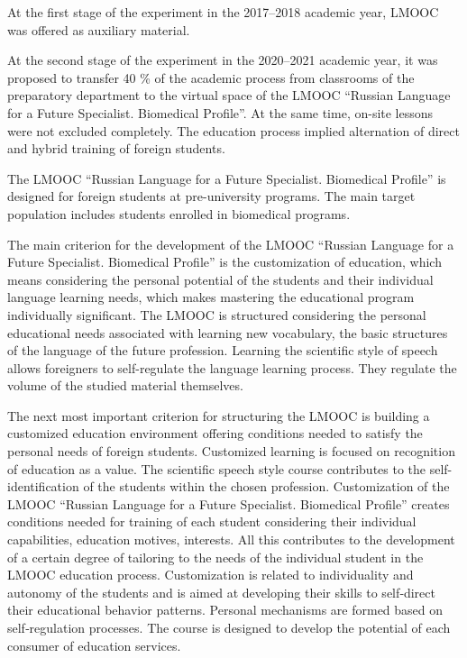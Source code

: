 \documentclass[english]{textolivre}
\begin{document}
At the first stage of the experiment in the 2017–2018 academic year, LMOOC was offered as auxiliary material.

At the second stage of the experiment in the 2020–2021 academic year, it was proposed to transfer 40 \% of the academic process from classrooms of the preparatory department to the virtual space of the LMOOC “Russian Language for a Future Specialist. Biomedical Profile”. At the same time, on-site lessons were not excluded completely. The education process implied alternation of direct and hybrid training of foreign students.

The LMOOC “Russian Language for a Future Specialist. Biomedical Profile” is designed for foreign students at pre-university programs. The main target population includes students enrolled in biomedical programs.

The main criterion for the development of the LMOOC “Russian Language for a Future Specialist. Biomedical Profile” is the customization of education, which means considering the personal potential of the students and their individual language learning needs, which makes mastering the educational program individually significant. The LMOOC is structured considering the personal educational needs associated with learning new vocabulary, the basic structures of the language of the future profession. Learning the scientific style of speech allows foreigners to self-regulate the language learning process. They regulate the volume of the studied material themselves.

The next most important criterion for structuring the LMOOC is building a customized education environment offering conditions needed to satisfy the personal needs of foreign students. Customized learning is focused on recognition of education as a value. The scientific speech style course contributes to the self-identification of the students within the chosen profession. Customization of the LMOOC “Russian Language for a Future Specialist. Biomedical Profile” creates conditions needed for training of each student considering their individual capabilities, education motives, interests. All this contributes to the development of a certain degree of tailoring to the needs of the individual student in the LMOOC education process. Customization is related to individuality and autonomy of the students and is aimed at developing their skills to self‑direct their educational behavior patterns. Personal mechanisms are formed based on self‑regulation processes. The course is designed to develop the potential of each consumer of education services.
\end{document}

